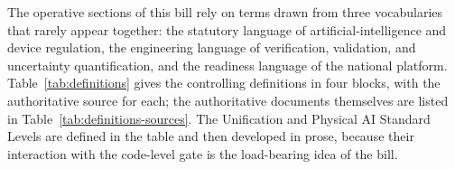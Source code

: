 
The operative sections of this bill rely on terms drawn from three vocabularies
that rarely appear together: the statutory language of artificial-intelligence
and device regulation, the engineering language of verification, validation, and
uncertainty quantification, and the readiness language of the national platform.
Table~\ref{tab:definitions} gives the controlling definitions in four blocks, with
the authoritative source for each; the authoritative documents themselves are
listed in Table~\ref{tab:definitions-sources}. The Unification and Physical AI
Standard Levels are defined in the table and then developed in prose, because
their interaction with the code-level gate is the load-bearing idea of the bill.

